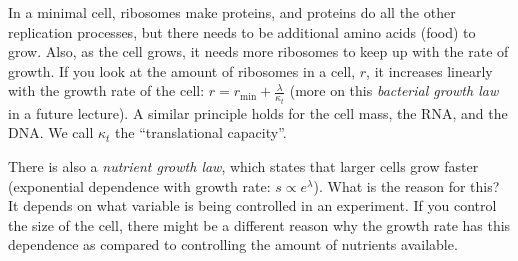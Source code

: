 \documentclass[a4paper,twoside,master.tex]{subfiles}
\begin{document}
\begin{itemize}
        In a minimal cell, ribosomes make proteins, and proteins do all the other replication processes, but there needs to be additional amino acids (food) to grow. Also, as the cell grows, it needs more ribosomes to keep up with the rate of growth. If you look at the amount of ribosomes in a cell, $ r $, it increases linearly with the growth rate of the cell: $ r = r_{\text{min}} + \frac{\lambda}{\kappa_t} $ (more on this \textit{bacterial growth law} in a future lecture). A similar principle holds for the cell mass, the RNA, and the DNA. We call $ \kappa_t $ the ``translational capacity''.

        There is also a \textit{nutrient growth law}, which states that larger cells grow faster (exponential dependence with growth rate: $ s \propto e^{\lambda} $). What is the reason for this? It depends on what variable is being controlled in an experiment. If you control the size of the cell, there might be a different reason why the growth rate has this dependence as compared to controlling the amount of nutrients available.
\end{itemize}
\end{document}
